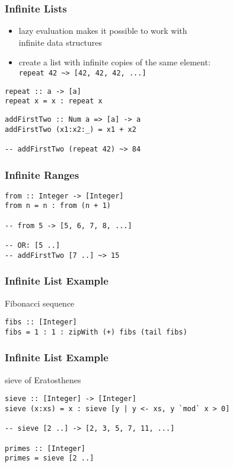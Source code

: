 \documentclass[dvipsnames]{beamer}
\theoremstyle{plain}
\begin{document}
\begin{frame}[fragile]
  \frametitle{Infinite Lists}

  \begin{itemize}
    \item lazy evaluation makes it possible to work with\\
      infinite data structures
    \item create a list with infinite copies of the same element:\\
      \lstinline|repeat 42 ~> [42, 42, 42, ...]|
  \end{itemize}

  \begin{exampleblock}{}
    \begin{lstlisting}[deletekeywords={repeat}]
repeat :: a -> [a]
repeat x = x : repeat x
    \end{lstlisting}

    \pause
    \medskip
    \begin{lstlisting}
addFirstTwo :: Num a => [a] -> a
addFirstTwo (x1:x2:_) = x1 + x2

-- addFirstTwo (repeat 42) ~> 84
    \end{lstlisting}
  \end{exampleblock}
\end{frame}

\begin{frame}[fragile]
  \frametitle{Infinite Ranges}

  \begin{lstlisting}
from :: Integer -> [Integer]
from n = n : from (n + 1)

-- from 5 -> [5, 6, 7, 8, ...]

-- OR: [5 ..]
-- addFirstTwo [7 ..] ~> 15
  \end{lstlisting}
\end{frame}

\begin{frame}[fragile]
  \frametitle{Infinite List Example}

  \begin{exampleblock}{Fibonacci sequence}
    \begin{lstlisting}
fibs :: [Integer]
fibs = 1 : 1 : zipWith (+) fibs (tail fibs)
    \end{lstlisting}
  \end{exampleblock}
\end{frame}

\begin{frame}[fragile]
  \frametitle{Infinite List Example}

  \begin{exampleblock}{sieve of Eratosthenes}
    \begin{lstlisting}
sieve :: [Integer] -> [Integer]
sieve (x:xs) = x : sieve [y | y <- xs, y `mod` x > 0]

-- sieve [2 ..] -> [2, 3, 5, 7, 11, ...]

primes :: [Integer]
primes = sieve [2 ..]
    \end{lstlisting}
  \end{exampleblock}
\end{frame}
\end{document}
